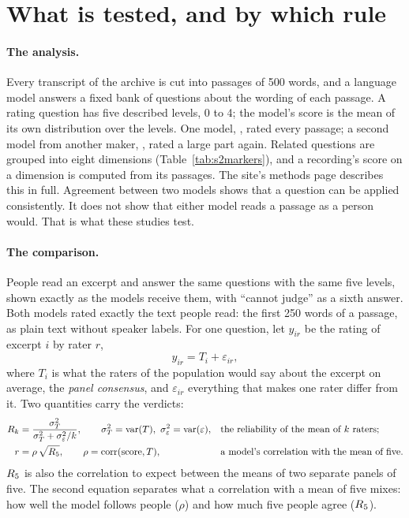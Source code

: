\section{What is tested, and by which rule}\label{sec:question}

\paragraph{The analysis.} Every transcript of the archive is cut into passages of 500 words, and a language
model answers a fixed bank of questions about the wording of each passage. A rating question has five described
levels, 0 to 4; the model's score is the mean of its own distribution over the levels. One model, \jev{}, rated
every passage; a second model from another maker, \drex{}, rated a large part again. Related questions are
grouped into eight dimensions (Table~\ref{tab:s2markers}), and a recording's score on a dimension is computed
from its passages. The site's methods page describes this in full. Agreement between two models shows that a
question can be applied consistently. It does not show that either model reads a passage as a person would.
That is what these studies test.

\paragraph{The comparison.} People read an excerpt and answer the same questions with the same five levels,
shown exactly as the models receive them, with ``cannot judge'' as a sixth answer. Both models rated exactly the
text people read: the first 250 words of a passage, as plain text without speaker labels. For one question, let
$y_{ir}$ be the rating of excerpt $i$ by rater $r$,
\begin{equation}\label{eq:measurement}
  y_{ir} = T_i + \varepsilon_{ir},
\end{equation}
where $T_i$ is what the raters of the population would say about the excerpt on average, the \emph{panel
consensus}, and $\varepsilon_{ir}$ everything that makes one rater differ from it. Two quantities carry the
verdicts:
\begin{align}
  R_{k} &= \frac{\sigma_T^2}{\sigma_T^2 + \sigma_\varepsilon^2/k}, \qquad \sigma_T^2 = \operatorname{var}(T),\ \sigma_\varepsilon^2 = \operatorname{var}(\varepsilon), && \text{the reliability of the mean of $k$ raters;} \label{eq:rel}\\
  r &= \rho\,\sqrt{R_{5}}, \qquad \rho = \operatorname{corr}(\text{score}, T), && \text{a model's correlation with the mean of five.} \label{eq:r}
\end{align}
$R_{5}$ is also the correlation to expect between the means of two separate panels of five. The second equation
separates what a correlation with a mean of five mixes: how well the model follows people ($\rho$) and how much
five people agree ($R_{5}$).

